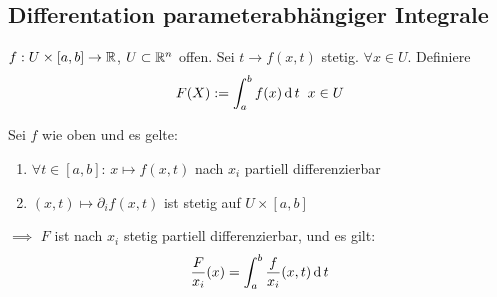 \subsection{Differentation parameterabhängiger Integrale}
$f:U\times [a,b]\rightarrow\mathbb{R}$, $U\subset\mathbb{R}^n$ offen. Sei $t\to f(x,t)$ stetig. $\forall x\in U$. Definiere
\[F(X):=\int_a^bf(x)\operatorname{d} t\hspace{2mm} x\in U\]
\begin{Sat}
  Sei $f$ wie oben und es gelte:
  \begin{enumerate}
    \item $\forall t\in [a,b]$: $x\mapsto f(x,t)$ nach $x_i$ partiell differenzierbar
    \item $(x,t)\mapsto \partial_if(x,t)$ ist stetig auf $U\times [a,b]$
  \end{enumerate}
  $\implies$ $F$ ist nach $x_i$ stetig partiell differenzierbar, und es gilt:
  \[\dfrac{F}{x_i}(x)=\int_a^b\dfrac{f}{x_i}(x,t)\operatorname{d} t\]
\end{Sat}

